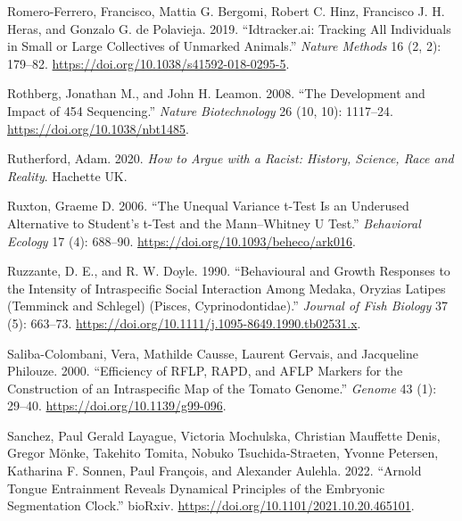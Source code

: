 \documentclass[
]{book}
\newlength{\cslhangindent}
\newlength{\cslentryspacingunit} %
\newenvironment{CSLReferences}[2] %
 {%
  \setlength{\parindent}{0pt}
  \ifodd #1
  \let\oldpar\par
  \def\par{\hangindent=\cslhangindent\oldpar}
  \fi
  \setlength{\parskip}{#2\cslentryspacingunit}
 }%
 {}
\begin{document}
\begin{CSLReferences}{1}{0}
\leavevmode{}%
Romero-Ferrero, Francisco, Mattia G. Bergomi, Robert C. Hinz, Francisco J. H. Heras, and Gonzalo G. de Polavieja. 2019. {``Idtracker.ai: Tracking All Individuals in Small or Large Collectives of Unmarked Animals.''} \emph{Nature Methods} 16 (2, 2): 179--82. \url{https://doi.org/10.1038/s41592-018-0295-5}.

\leavevmode{}%
Rothberg, Jonathan M., and John H. Leamon. 2008. {``The Development and Impact of 454 Sequencing.''} \emph{Nature Biotechnology} 26 (10, 10): 1117--24. \url{https://doi.org/10.1038/nbt1485}.

\leavevmode{}%
Rutherford, Adam. 2020. \emph{How to Argue with a Racist: {History}, Science, Race and Reality}. {Hachette UK}.

\leavevmode{}%
Ruxton, Graeme D. 2006. {``The Unequal Variance t-Test Is an Underused Alternative to {Student}'s t-Test and the {Mann}--{Whitney U} Test.''} \emph{Behavioral Ecology} 17 (4): 688--90. \url{https://doi.org/10.1093/beheco/ark016}.

\leavevmode{}%
Ruzzante, D. E., and R. W. Doyle. 1990. {``Behavioural and Growth Responses to the Intensity of Intraspecific Social Interaction Among Medaka, {Oryzias} Latipes ({Temminck} and {Schlegel}) ({Pisces}, {Cyprinodontidae}).''} \emph{Journal of Fish Biology} 37 (5): 663--73. \url{https://doi.org/10.1111/j.1095-8649.1990.tb02531.x}.

\leavevmode{}%
Saliba-Colombani, Vera, Mathilde Causse, Laurent Gervais, and Jacqueline Philouze. 2000. {``Efficiency of {RFLP}, {RAPD}, and {AFLP} Markers for the Construction of an Intraspecific Map of the Tomato Genome.''} \emph{Genome} 43 (1): 29--40. \url{https://doi.org/10.1139/g99-096}.

\leavevmode{}%
Sanchez, Paul Gerald Layague, Victoria Mochulska, Christian Mauffette Denis, Gregor Mönke, Takehito Tomita, Nobuko Tsuchida-Straeten, Yvonne Petersen, Katharina F. Sonnen, Paul François, and Alexander Aulehla. 2022. {``Arnold Tongue Entrainment Reveals Dynamical Principles of the Embryonic Segmentation Clock.''} {bioRxiv}. \url{https://doi.org/10.1101/2021.10.20.465101}.


\end{CSLReferences}
\end{document}
